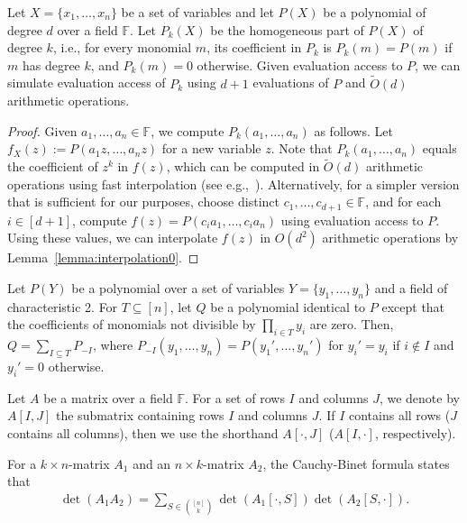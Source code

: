 \documentclass{theoretics}
\newcommand{\F}{\ensuremath{\mathbb F}\xspace}
\begin{document}
\begin{lemma} \label{lemma:interpolation}
  Let $X = \{ x_1, \dots, x_n \}$ be a set of variables and let $P(X)$ be a polynomial of degree $d$ over a field $\F$.
  Let $P_k(X)$ be the homogeneous part of $P(X)$ of degree $k$, i.e., for every monomial $m$, its coefficient in $P_k$ is $P_k(m) = P(m)$ if $m$ has degree $k$, and $P_k(m) = 0$ otherwise. 
  Given evaluation access to $P$, we can simulate evaluation access of $P_k$ using $d + 1$ evaluations of $P$ and $\tilde{O}(d)$ arithmetic operations.
\end{lemma}
\begin{proof}
  Given $a_1, \dots, a_n \in \F$, we compute $P_k(a_1, \dots, a_n)$ as follows.
  Let $f_X(z):=P(a_1 z, \ldots, a_n z)$ for a new variable $z$.
  Note that $P_k(a_1, \dots, a_n)$ equals the coefficient of $z^k$ in $f(z)$,
  which can be computed in $\tilde{O}(d)$ arithmetic operations using
  fast interpolation (see e.g.,~\cite{vzGathen-MCA}). Alternatively,
  for a simpler version that is sufficient for our purposes, 
  choose distinct $c_1, \dots, c_{d+1} \in \F$, and for each $i \in [d+1]$, compute $f(z) = P(c_i a_1, \dots, c_i a_n)$ using evaluation access to $P$.
  Using these values, we can interpolate $f(z)$ in $O(d^2)$ arithmetic operations by Lemma~\ref{lemma:interpolation0}.
\end{proof}

\begin{lemma}
  \label{lemma:inclusion-exclusion}
  Let $P(Y)$ be a polynomial over a set of variables $Y = \{ y_1, \dots, y_n \}$ and a field of characteristic 2.
  For $T \subseteq [n]$, let $Q$ be a polynomial identical to $P$ except that the coefficients of monomials not divisible by $\prod_{i \in T} y_i$ are zero.
  Then, $Q = \sum_{I \subseteq T} P_{-I}$, where $P_{-I}(y_1, \dots, y_n) = P(y_1', \dots, y_n')$ for $y_i' = y_i$ if $i \notin I$ and $y_i' = 0$ otherwise. 
\end{lemma}

Let $A$ be a matrix over a field $\F$.
For a set of rows $I$ and columns $J$, we denote by $A[I, J]$ the submatrix containing rows $I$ and columns $J$.
If $I$ contains all rows ($J$ contains all columns), then we use the shorthand $A[\cdot, J]$ ($A[I, \cdot]$, respectively).

For a $k \times n$-matrix $A_1$ and an $n \times k$-matrix $A_2$, the Cauchy-Binet formula states that
\begin{align*}
  \det (A_1 A_2) = \sum_{S \in \binom{[n]}{k}} \det (A_1[\cdot, S]) \det (A_2[S, \cdot]).
\end{align*}
\end{document}

